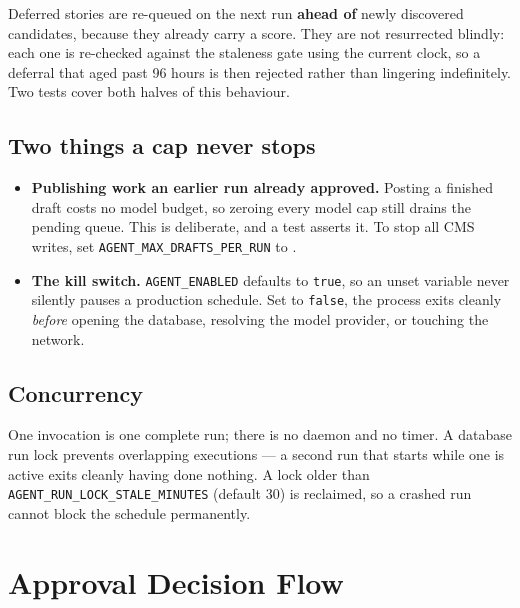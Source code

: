 \documentclass[11pt,a4paper]{article}
\newcommand{\var}[1]{\texttt{\small\hyphenpenalty=0\exhyphenpenalty=0\relax #1}}
\newcommand{\us}{\_\discretionary{}{}{}}
\newcommand{\brk}{\hyphenpenalty=0\exhyphenpenalty=0\relax}
\newcommand{\code}[1]{\texttt{\small\brk #1}}
\begin{document}
\begin{holdbox}
Deferred stories are re-queued on the next run \textbf{ahead of} newly discovered
candidates, because they already carry a score. They are not resurrected blindly:
each one is re-checked against the staleness gate using the current clock, so a
deferral that aged past 96 hours is then rejected rather than lingering
indefinitely. Two tests cover both halves of this behaviour.
\end{holdbox}

\subsection{Two things a cap never stops}

\begin{itemize}[leftmargin=1.2em,itemsep=0.2em]
  \item \textbf{Publishing work an earlier run already approved.} Posting a
    finished draft costs no model budget, so zeroing every model cap still drains
    the pending queue. This is deliberate, and a test asserts it. To stop all CMS
    writes, set \var{AGENT\us MAX\us DRAFTS\us PER\us RUN} to \code{0}.
  \item \textbf{The kill switch.} \var{AGENT\us ENABLED} defaults to \code{true},
    so an unset variable never silently pauses a production schedule. Set to
    \code{false}, the process exits cleanly \emph{before} opening the database,
    resolving the model provider, or touching the network.
\end{itemize}

\subsection{Concurrency}

One invocation is one complete run; there is no daemon and no timer. A database
run lock prevents overlapping executions --- a second run that starts while one is
active exits cleanly having done nothing. A lock older than
\var{AGENT\us RUN\us LOCK\us STALE\us MINUTES} (default 30) is reclaimed, so a
crashed run cannot block the schedule permanently.

\clearpage
\section{Approval Decision Flow}
\end{document}
